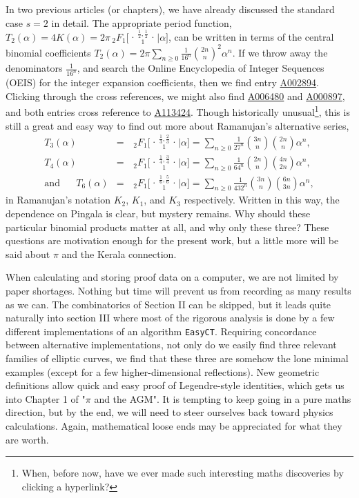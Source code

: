 \documentclass[nofootinbib,preprint]{revtex4-1}
\newcommand{\tFo}[3]{\,_2F_1 \bigg[ 
\genfrac..{0pt}{}{#1}{#2}\bigg| #3 \bigg]}
\newcommand{\tFoIn}[3]{\,_2F_1 \Big[ 
\genfrac..{0pt}{}{#1}{#2}\Big| #3 \Big]}
\begin{document}
In two previous articles (or chapters), we have already discussed the standard case $s=2$ 
in detail\cite{KLEE2020Prelude,KLEE2020Pendulum}. The appropriate period function, 
$T_2(\alpha) = 4K(\alpha)=2\pi\tFoIn{\frac{1}{2},\frac{1}{2}}{1}{\alpha}$, can
be written in terms of the central binomial coefficients 
$T_2(\alpha) = 2\pi\sum_{n\ge 0} \frac{1}{16^n}\binom{2n}{n}^2 \alpha^n$. 
If we throw away the denominators $\frac{1}{16^n}$, and search the Online Encyclopedia of Integer Sequences 
(OEIS)\cite{SLOANE2020} for the integer expansion coefficients, then we find entry 
\href{https://oeis.org/A002894}{A002894}. Clicking through the cross references, we might 
also find  \href{https://oeis.org/A006480}{A006480} and \href{https://oeis.org/A000897}{A000897}, and both 
entries cross reference to \href{https://oeis.org/A113424}{A113424}. Though historically unusual\footnote{When, 
before now, have we ever made such interesting maths discoveries by clicking a hyperlink?}, this is still a great and 
easy way to find out more about Ramanujan's alternative series, 
\begin{eqnarray}
T_3(\alpha)  &=&  \tFo{\frac{1}{3},\frac{2}{3}}{1}{\alpha} 
= \sum_{n\ge 0} \frac{1}{27^n}\binom{3n}{n}\binom{2n}{n}\alpha^n, \nonumber \\ 
T_4(\alpha)  &=&  \tFo{\frac{1}{4},\frac{3}{4}}{1}{\alpha} 
= \sum_{n\ge 0} \frac{1}{64^n} \binom{2n}{n}\binom{4n}{2n}\alpha^n,  \nonumber \\ 
\text{and} \;\;\;\;\;\;T_6(\alpha)  &=&  \tFo{\frac{1}{6},\frac{5}{6}}{1}{\alpha} 
=  \sum_{n\ge 0}\frac{1}{432^n}\binom{3n}{n}\binom{6n}{3n}\alpha^n,  \nonumber 
\end{eqnarray}
in Ramanujan's notation $K_2$, $K_1$, and $K_3$ respectively. Written in this way, the 
dependence on Pingala is clear, but mystery remains. Why should these particular 
binomial products matter at all, and why only these three? These questions are motivation
enough for the present work, but a little more will be said about $\pi$ and the Kerala connection.

When calculating and storing proof data on a computer, we are not limited by paper shortages. 
Nothing but time will prevent us from recording as many results as we can. The combinatorics of 
Section II can be skipped, but it leads quite naturally into section III where most of the 
rigorous analysis is done by a few different implementations of an algorithm \texttt{EasyCT}. 
Requiring concordance between alternative implementations, not only do we easily find three 
relevant families of elliptic curves, we find that these three are somehow the lone minimal 
examples (except for a few higher-dimensional reflections). New geometric definitions allow
quick and easy proof of Legendre-style identities, which gets us into Chapter 1 of  
"$\pi$ and the AGM"\cite{BORWEIN1987}. It is tempting to keep going in a pure maths 
direction, but by the end,
we will need to steer ourselves back toward physics calculations. Again, mathematical loose
ends may be appreciated for what they are worth. 
\end{document}
